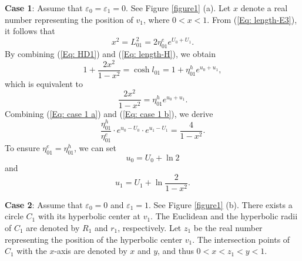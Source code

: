 \documentclass[12pt]{amsart}
\theoremstyle{definition}
\begin{document}
\textbf{Case 1}: 
Assume that $\varepsilon_0=\varepsilon_1=0$.
See Figure \ref{figure1} (a).
Let $x$ denote a real number representing the position of $v_1$, where $0<x<1$.
From (\ref{Eq: length-E3}), it follows that
\begin{equation}\label{Eq: case 1 a} 
x^2=L_{01}^2=2\eta_{01}^ee^{U_0+U_1}.
\end{equation}
By combining (\ref{Eq: HD1}) and (\ref{Eq: length-H}), we obtain
\begin{equation*}
1+\frac{2x^2}{1-x^2}=\cosh l_{01}
=1+\eta_{01}^he^{u_0+u_1},
\end{equation*}
which is equivalent to
\begin{equation}\label{Eq: case 1 b} 
\frac{2x^2}{1-x^2}
=\eta_{01}^he^{u_0+u_1}.
\end{equation}
Combining (\ref{Eq: case 1 a}) and (\ref{Eq: case 1 b}), we derive
\begin{equation}\label{Eq: F17}
\frac{\eta_{01}^h}{\eta_{01}^e}\cdot e^{u_0-U_0}\cdot e^{u_1-U_1}=\frac{4}{1-x^2}.
\end{equation}
To ensure $\eta_{01}^e=\eta_{01}^h$, we can set
\begin{equation*}
u_0=U_0+\ln 2
\end{equation*}
and
\begin{equation*}
u_1=U_1+\ln\frac{2}{1-x^2}.
\end{equation*}


\textbf{Case 2}:
Assume that $\varepsilon_0=0$ and $\varepsilon_1=1$.
See Figure \ref{figure1} (b).
There exists a circle $C_1$ with its hyperbolic center at $v_1$.
The Euclidean and the hyperbolic radii of $C_1$ are denoted by $R_1$ and $r_1$, respectively.
Let $z_1$ be the real number representing the position of the hyperbolic center $v_1$.
The intersection points of $C_1$ with the $x$-axis are denoted by $x$ and $y$, and thus $0<x<z_1<y<1$.
\end{document}
